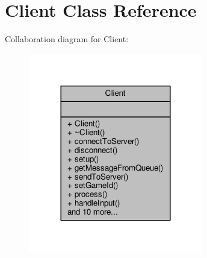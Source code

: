 \hypertarget{class_client}{}\section{Client Class Reference}
\label{class_client}


Collaboration diagram for Client\+:\nopagebreak
\begin{figure}[H]
\begin{center}
\leavevmode
\includegraphics[width=216pt]{de/d44/class_client__coll__graph}
\end{center}
\end{figure}
